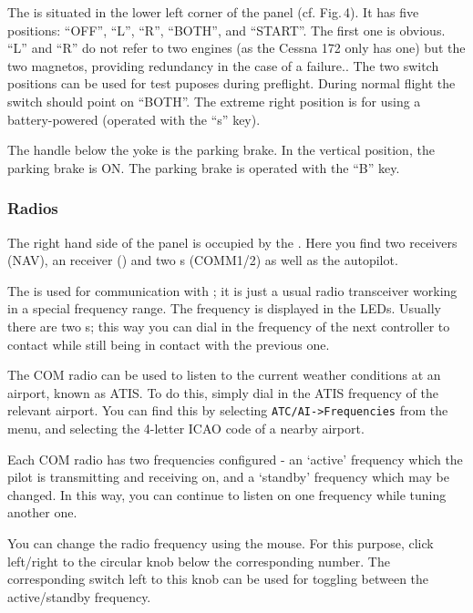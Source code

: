 The  is situated in the lower left corner of the
panel (cf. Fig.\,4). It has five positions: ``OFF'', ``L'', ``R'',
``BOTH'', and ``START''. The first one is obvious. ``L'' and ``R'' do
not refer to two engines (as the Cessna 172 only has one) but the
two magnetos, providing redundancy in the case of a failure.. The two switch
positions can be used for test puposes during preflight. During normal
flight the switch should point on ``BOTH''. The extreme right position
is for  using a battery-powered
 (operated with the ``s'' key).

The handle below the yoke is the parking brake. In the vertical position,
the parking brake is ON. The parking brake is operated with the ``B'' key.

\subsubsection{Radios}

The right hand side of the panel is occupied by the . Here
you find two  receivers (NAV), an  receiver
() and two s (COMM1/2)
 as well as the autopilot.

The  is used for communication with ; it is just a usual radio transceiver working in a special
frequency range. The frequency is displayed in the LEDs. Usually
there are two s; this way you can dial in the frequency
of the next controller to contact while still being in contact with the previous
one.

The COM radio can be used to listen to the current weather conditions at an
airport, known as ATIS. To do this, simply dial in the ATIS frequency of the
relevant airport. You can find this by selecting \texttt{ATC/AI->Frequencies}
from the menu, and selecting the 4-letter ICAO code of a nearby airport.

Each COM radio has two frequencies configured - an `active' frequency which
the pilot is transmitting and receiving on, and a `standby' frequency which may
be changed. In this way, you can continue to listen on one frequency while tuning
another one.

You can change the radio frequency using the mouse. For this
purpose, click left/right to the circular knob below the corresponding
number. The corresponding switch left to this knob can be used for
toggling between the active/standby frequency.

